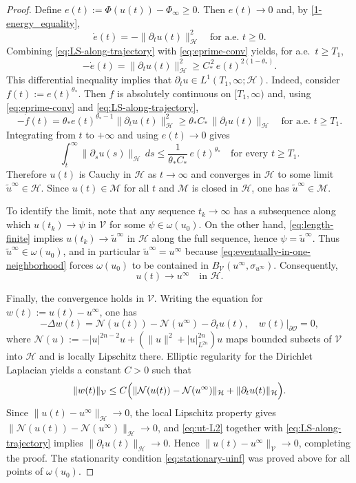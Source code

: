 \documentclass[reqno]{amsart}
\begin{document}
\begin{proof}
Define $e(t):=\Phi(u(t))-\Phi_\infty\ge 0$. Then $e(t)\to 0$ and,
 by \eqref{1-energy_equality},
\begin{equation}\label{eq:eprime-conv}
\dot e(t)=-\|\partial_t u(t)\|_{\mathcal H}^2\quad\text{for a.e.\ }t\ge 0.
\end{equation}
Combining \eqref{eq:LS-along-trajectory} with \eqref{eq:eprime-conv} yields,
for a.e.\ $t\ge T_1$,
\[
-\dot e(t)=\|\partial_t u(t)\|_{\mathcal H}^2
\ge C_*^{\,2}\,e(t)^{2(1-\theta_*)}.
\]
This differential inequality implies that $\partial_t u\in L^1(T_1,\infty;\mathcal H)$.
Indeed, consider $f(t):=e(t)^{\theta_*}$. Then $f$ is absolutely continuous on
 $[T_1,\infty)$ and, using
\eqref{eq:eprime-conv} and \eqref{eq:LS-along-trajectory},
\[
-\dot f(t)
=\theta_* e(t)^{\theta_*-1}\|\partial_t u(t)\|_{\mathcal H}^2
\ge \theta_* C_*\,\|\partial_t u(t)\|_{\mathcal H}
\quad\text{for a.e.\ }t\ge T_1.
\]
Integrating from $t$ to $+\infty$ and using $e(t)\to 0$ gives
\begin{equation}\label{eq:length-finite}
\int_t^\infty \|\partial_s u(s)\|_{\mathcal H}\,ds
\le \frac{1}{\theta_* C_*}\,e(t)^{\theta_*}\quad\text{for every }t\ge T_1.
\end{equation}
Therefore $u(t)$ is Cauchy in $\mathcal H$ as $t\to\infty$ and converges in
$\mathcal H$ to some limit $\tilde u^\infty\in\mathcal H$.
Since $u(t)\in\mathcal M$ for all $t$ and $\mathcal M$ is
closed in $\mathcal H$, one has $\tilde u^\infty\in\mathcal M$.

To identify the limit, note that any sequence $t_k\to\infty$ has a subsequence along
 which $u(t_k)\to \psi$ in $\mathcal V$ for some $\psi\in\omega(u_0)$.
On the other hand,
\eqref{eq:length-finite} implies $u(t_k)\to \tilde u^\infty$ in $\mathcal H$ along
the full sequence, hence $\psi=\tilde u^\infty$. Thus $\tilde u^\infty\in\omega(u_0)$,
and in particular
$\tilde u^\infty=u^\infty$ because \eqref{eq:eventually-in-one-neighborhood}
forces $\omega(u_0)$ to be contained in $B_{\mathcal V}(u^\infty,\sigma_{u^\infty})$.
Consequently,
\[
u(t)\longrightarrow u^\infty\quad\text{in }\mathcal H.
\]

Finally, the convergence holds in $\mathcal V$. Writing the equation for
$w(t):=u(t)-u^\infty$, one has
\[
-\Delta w(t)=\mathcal N(u(t))-\mathcal N(u^\infty)-\partial_t u(t),
\quad w(t)|_{\partial\mathcal O}=0,
\]
where $\mathcal N(u):=-|u|^{2n-2}u+(\|u\|^2+|u|_{L^{2n}}^{2n})u$ maps bounded subsets
of $\mathcal V$ into $\mathcal H$ and is locally Lipschitz there. Elliptic regularity
for the Dirichlet Laplacian yields a constant $C>0$ such that
\[
\|w(t)\|_{\mathcal V}\le C\Bigl(\|\mathcal N(u(t))-\mathcal N(u^\infty)\|_{\mathcal H}
+\|\partial_t u(t)\|_{\mathcal H}\Bigr).
\]
Since $\|u(t)-u^\infty\|_{\mathcal H}\to 0$, the local Lipschitz property gives
$\|\mathcal N(u(t))-\mathcal N(u^\infty)\|_{\mathcal H}\to 0$, and \eqref{eq:ut-L2}
together with \eqref{eq:LS-along-trajectory} implies
$\|\partial_t u(t)\|_{\mathcal H}\to 0$. Hence
$\|u(t)-u^\infty\|_{\mathcal V}\to 0$, completing the proof. The stationarity condition
\eqref{eq:stationary-uinf} was proved above for all points of $\omega(u_0)$.
\end{proof}
\end{document}
